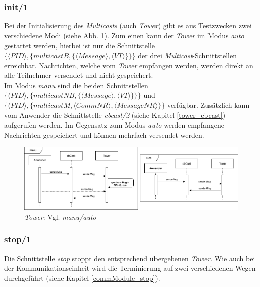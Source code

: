 \subsubsection{init/1}

Bei der Initialisierung des \textit{Multicasts} (auch \textit{Tower}) gibt es aus Testzwecken zwei verschiedene Modi (siehe Abb. \ref{fig:sequence_tower_init}). Zum einen kann der \textit{Tower} im Modus \textit{auto} gestartet werden, hierbei ist nur die Schnittstelle $\{\langle PID\rangle,\{multicastB,\{\langle Message\rangle,\langle VT\rangle\}\}\}$ der drei \textit{Multicast}-Schnittstellen erreichbar. Nachrichten, welche vom \textit{Tower} empfangen werden, werden direkt an alle Teilnehmer versendet und nicht gespeichert.\\
Im Modus \textit{manu} sind die beiden Schnittstellen $\{\langle PID\rangle,\{multicastNB,\{\langle Message\rangle,\langle VT\rangle\}\}\}$ und $\{\langle PID\rangle,\{multicastM,\langle CommNR\rangle,\langle MessageNR\rangle\}\}$ verfügbar. Zusätzlich kann vom Anwender die Schnittstelle \textit{cbcast/2} (siehe Kapitel \ref{tower_cbcast}) aufgerufen werden. Im Gegensatz zum Modus \textit{auto} werden empfangene Nachrichten gespeichert und können mehrfach versendet werden.

\begin{figure}[htbp]
\begin{center}
\includegraphics[scale=0.45]{Latex/Bilder/towerCBC_init.png}
\caption{\label{fig:sequence_tower_init} \textit{Tower}: Vgl. \textit{manu/auto}}
\end{center}
\end{figure}


\subsubsection{stop/1}

Die Schnittstelle \textit{stop} stoppt den entsprechend übergebenen \textit{Tower}. Wie auch bei der Kommunikationseinheit wird die Terminierung auf zwei verschiedenen Wegen durchgeführt (siehe Kapitel \ref{commModule_stop}).

